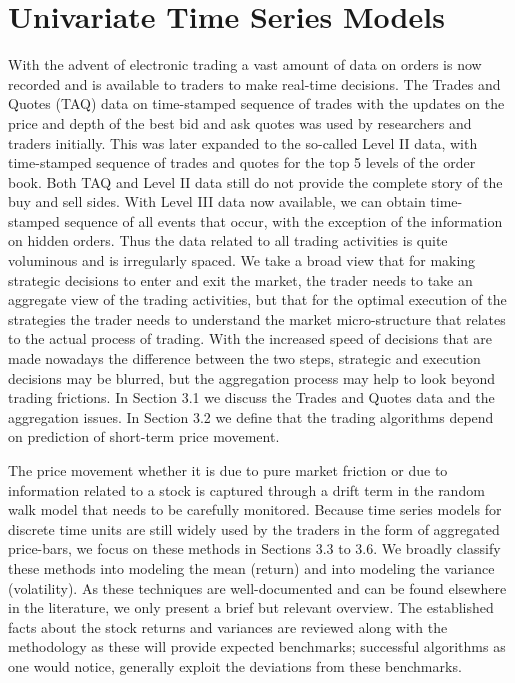 \chapter{Univariate Time Series Models \label{ch:ch_uvts}}

With the advent of electronic trading a vast amount of data on orders is now recorded and is available to traders to make real-time decisions. The Trades and Quotes (TAQ) data on time-stamped sequence of trades with the updates on the price and depth of the best bid and ask quotes was used by researchers and traders initially. This was later expanded to the so-called Level II data, with time-stamped sequence of trades and quotes for the top 5 levels of the order book. Both TAQ and Level II data still do not provide the complete story of the buy and sell sides. With Level III data now available, we can obtain time-stamped sequence of all events that occur, with the exception of the information on hidden orders. Thus the data related to all trading activities is quite voluminous and is irregularly spaced. We take a broad view that for making strategic decisions to enter and exit the market, the trader needs to take an aggregate view of the trading activities, but that for the optimal execution of the strategies the trader needs to understand the market micro-structure that relates to the actual process of trading. With the increased speed of decisions that are made nowadays the difference between the two steps, strategic and execution decisions may be blurred, but the aggregation process may help to look beyond trading frictions. In Section 3.1 we discuss the Trades and Quotes data and the aggregation issues. In Section 3.2 we define that the trading algorithms depend on prediction of short-term price movement.


The price movement whether it is due to pure market friction or due to information related to a stock is captured through a drift term in the random walk model that needs to be carefully monitored. Because time series models for discrete time units are still widely used by the traders in the form of aggregated price-bars, we focus on these methods in Sections 3.3 to 3.6. We broadly classify these methods into modeling the mean (return) and into modeling the variance (volatility). As these techniques are well-documented and can be found elsewhere in the literature, we only present a brief but relevant overview. The established facts about the stock returns and variances are reviewed along with the methodology as these will provide expected benchmarks; successful algorithms as one would notice, generally exploit the deviations from these benchmarks.


